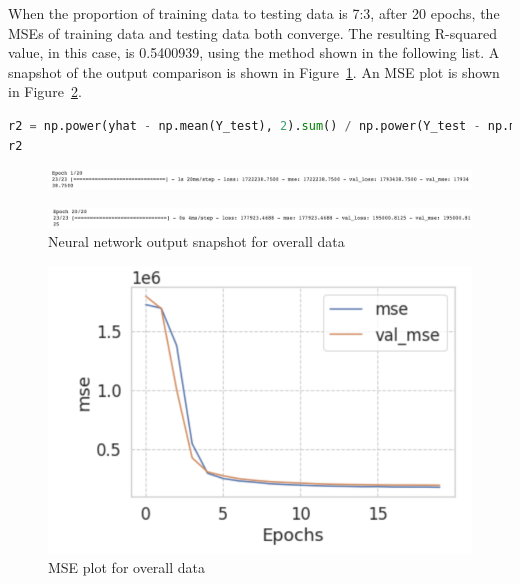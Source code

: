 \documentclass{scrartcl}
\begin{document}
\noindent When the proportion of training data to testing data is 7:3, after 20 epochs, the MSEs of training data and testing data both converge. The resulting R-squared value, in this case, is 0.5400939, using the method shown in the following list. A snapshot of the output comparison is shown in Figure~\ref{fig:NN7-8}. An MSE plot is shown in Figure~\ref{fig:net}. \\

\begin{lstlisting}[language=Python, caption= R-Squared output code, basicstyle=\tiny,captionpos=b]
r2 = np.power(yhat - np.mean(Y_test), 2).sum() / np.power(Y_test - np.mean(Y_test), 2).sum()
r2

\end{lstlisting}

\begin{figure}[H]
         \centering
         \includegraphics[width=\textwidth]{Graphics/Neural Network Images/NN7.png}
\end{figure}
     
\begin{figure}[H]
         \centering
         \includegraphics[width=\textwidth]{Graphics/Neural Network Images/NN8.png}
         \caption{Neural network output snapshot for overall data}
         \label{fig:NN7-8}
\end{figure}


\begin{figure}[H]
	\begin{center}
		\includegraphics[scale=1.0]{Graphics/Neural Network Images/NN6.png}
	\end{center}
	\caption{MSE plot for overall data}
	\label{fig:net}
\end{figure}
\end{document}
